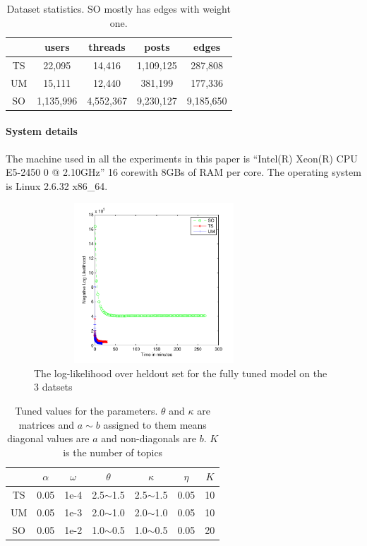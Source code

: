 \documentclass{sig-alternate}
\begin{document}
\begin{table}
\begin{center}
\begin{tabular}{c|c|c|c|c|}
 & users & threads & posts & edges\\\hline
 TS & 22,095 & 14,416 & 1,109,125 & 287,808\\\hline
 UM & 15,111 & 12,440 & 381,199 & 177,336\\\hline
 SO & 1,135,996 & 4,552,367 & 9,230,127 & 9,185,650\\\hline
\end{tabular}
\label{tab:dataStats}
\end{center}
\caption{Dataset statistics. SO mostly has edges with weight one.}
\end{table}

\paragraph{System details} The machine used in all the experiments in this paper
is ``Intel(R) Xeon(R) CPU E5-2450 0 @ 2.10GHz'' 16 corewith 8GBs of
RAM per core. The operating system is Linux 2.6.32 x86\_64. 


 
\begin{figure}
\begin{center}
\includegraphics[height=6cm,width=9cm]{3LLPlots.pdf}
\end{center}
\caption{The log-likelihood over heldout set for the fully tuned model on the
3 datsets}
\label{fig:finalLLheld}
\end{figure}

\begin{table}
\begin{center}
\begin{tabular}{c|c|c|c|c|c|c|}
 & $\alpha$ & $\omega$ & $\theta$ & $\kappa$ & $\eta$ & $K$\\\hline
 TS & 0.05 & 1e-4 & 2.5$\sim$1.5 & 2.5$\sim$1.5& 0.05 & 10\\\hline
 UM & 0.05 & 1e-3 & 2.0$\sim$1.0 & 2.0$\sim$1.0 & 0.05 & 10\\\hline
 SO & 0.05 & 1e-2 & 1.0$\sim$0.5 & 1.0$\sim$0.5 & 0.05 & 20\\\hline
\end{tabular}
\label{tab:tunedParameters}
\end{center}
\caption{Tuned values for the parameters. $\theta$ and $\kappa$ are matrices
and $a\sim b$ assigned to them means diagonal values are $a$ and non-diagonals
are $b$. $K$ is the number of topics}
\end{table}
\end{document}
